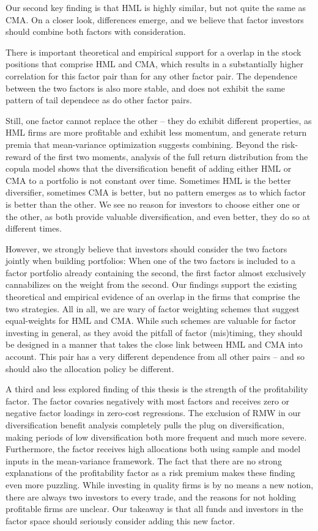 Our second key finding is that HML is highly similar, but not quite the same as CMA. On a closer look, differences emerge, and we believe that factor investors should combine both factors with consideration.

There is important theoretical and empirical support for a overlap in the stock positions that comprise HML and CMA, which results in a substantially higher correlation for this factor pair than for any other factor pair. The dependence between the two factors is also more stable, and does not exhibit the same pattern of tail dependece as do other factor pairs. 

Still, one factor cannot replace the other -- they do exhibit different properties, as HML firms are more profitable and exhibit less momentum, and generate return premia that mean-variance optimization suggests combining. Beyond the risk-reward of the first two moments, analysis of the full return distribution from the copula model shows that the diversification benefit of adding either HML or CMA to a portfolio is not constant over time. Sometimes HML is the better diversifier, sometimes CMA is better, but no pattern emerges as to which factor is better than the other. We see no reason for investors to choose either one or the other, as both provide valuable diversification, and even better, they do so at different times.

However, we strongly believe that investors should consider the two factors jointly when building portfolios: When one of the two factors is included to a factor portfolio already containing the second, the first factor almost exclusively cannabilizes on the weight from the second. Our findings support the existing theoretical and empirical evidence of an overlap in the firms that comprise the two strategies. All in all, we are wary of factor weighting schemes that suggest equal-weights for HML and CMA. While such schemes are valuable for factor investing in general, as they avoid the pitfall of factor (mis)timing, they should be designed in a manner that takes the close link between HML and CMA into account. This pair has a very different dependence from all other pairs -- and so should also the allocation policy be different.

A third and less explored finding of this thesis is the strength of the profitability factor. The factor covaries negatively with most factors and receives zero or negative factor loadings in zero-cost regressions. The exclusion of RMW in our diversification benefit analysis completely pulls the plug on diversification, making periods of low diversification both more frequent and much more severe. Furthermore, the factor receives high allocations both using sample and model inputs in the mean-variance framework. The fact that there are no strong explanations of the profitability factor as a risk premium makes these finding even more puzzling. While investing in quality firms is by no means a new notion, there are always two investors to every trade, and the reasons for not holding profitable firms are unclear. Our takeaway is that all funds and investors in the factor space should seriously consider adding this new factor.

